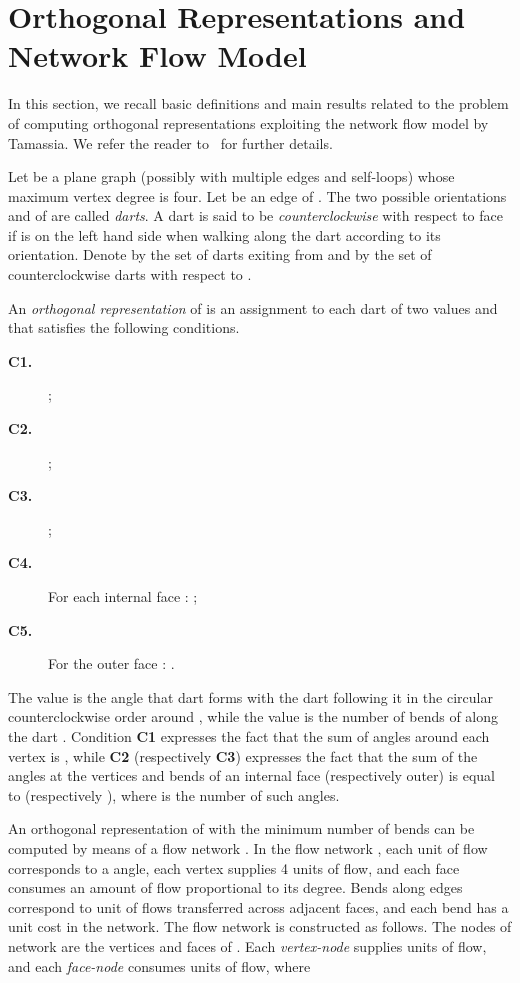 \documentclass{article}
\begin{document}
{\small }


\clearpage{}\appendix

\clearpage

\renewcommand\thesection{\Alph{section}}


\section{Orthogonal Representations and Network Flow Model}\label{ap:orthorep-flow}

In this section, we recall basic definitions and main results related to the problem of computing orthogonal representations exploiting the network flow model by Tamassia. We refer the reader to~\cite{dett-gdavg-99,Garg1997} for further details.

Let  be a plane graph (possibly with multiple edges and self-loops) whose maximum vertex degree is four. Let  be an edge of . The two possible orientations  and  of  are called \emph{darts}. A dart is said to be \emph{counterclockwise} with respect to face  if  is on the left hand side when walking along the dart according to its orientation. Denote by  the set of darts exiting from  and by  the set of counterclockwise darts with respect to . 

An \emph{orthogonal representation} of  is an assignment to each dart  of two values  and   that satisfies the following conditions.

\begin{description}
\item[\bf C1.] ;
\item[\bf C2.] ;
\item[\bf C3.] ;
\item[\bf C4.] For each internal face : ;
\item[\bf C5.] For the outer face : .
\end{description}

The value  is the angle that dart  forms with the dart following it in the circular counterclockwise order around , while the value  is the number of bends of  along the dart . Condition {\bf C1} expresses the fact that the sum of angles around each vertex is , while  {\bf C2} (respectively {\bf C3}) expresses the fact that the sum of the angles at the vertices and bends of an internal face (respectively outer) is equal to  (respectively ), where  is the number of such angles.

\medskip


An orthogonal representation of  with the minimum number of bends can be computed by means of a flow network . In the flow network , each unit of flow corresponds to a  angle, each vertex supplies 4 units of flow, and each face consumes an amount of flow proportional to its degree. Bends along edges correspond to unit of flows transferred across adjacent faces, and each bend has a unit cost in the network. The flow network  is constructed as follows. The nodes of network  are the vertices and faces of .  Each \emph{vertex-node}  supplies  units of flow, and each \emph{face-node}  consumes  units of flow, where
\end{document}
